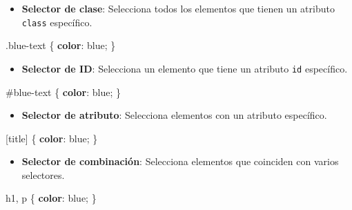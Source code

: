 \documentclass[
  a4paper,
  DIV=11,
  numbers=noendperiod,
  onepage,
  openany]{scrreprt}
\newenvironment{Shaded}{\begin{snugshade}}{\end{snugshade}}
\newcommand{\CharTok}[1]{\textcolor[rgb]{0.13,0.47,0.30}{#1}}
\newcommand{\ConstantTok}[1]{\textcolor[rgb]{0.56,0.35,0.01}{#1}}
\newcommand{\ExtensionTok}[1]{\textcolor[rgb]{0.00,0.23,0.31}{#1}}
\newcommand{\FunctionTok}[1]{\textcolor[rgb]{0.28,0.35,0.67}{#1}}
\newcommand{\KeywordTok}[1]{\textcolor[rgb]{0.00,0.23,0.31}{\textbf{#1}}}
\newcommand{\NormalTok}[1]{\textcolor[rgb]{0.00,0.23,0.31}{#1}}
\newcommand{\OperatorTok}[1]{\textcolor[rgb]{0.37,0.37,0.37}{#1}}
\newcommand{\PreprocessorTok}[1]{\textcolor[rgb]{0.68,0.00,0.00}{#1}}
\newcommand{\SpecialStringTok}[1]{\textcolor[rgb]{0.13,0.47,0.30}{#1}}
\providecommand{\tightlist}{%
  \setlength{\itemsep}{0pt}\setlength{\parskip}{0pt}}\usepackage{longtable,booktabs,array}
\begin{document}
\begin{tcolorbox}
\begin{itemize}
\tightlist
\item
  \textbf{Selector de clase}: Selecciona todos los elementos que tienen
  un atributo \texttt{class} específico.
\end{itemize}

\begin{Shaded}
\begin{Highlighting}[]
\FunctionTok{.blue{-}text}\NormalTok{ \{}
  \KeywordTok{color}\CharTok{:} \ConstantTok{blue}\OperatorTok{;}
\NormalTok{\}}
\end{Highlighting}
\end{Shaded}

\begin{itemize}
\tightlist
\item
  \textbf{Selector de ID}: Selecciona un elemento que tiene un atributo
  \texttt{id} específico.
\end{itemize}

\begin{Shaded}
\begin{Highlighting}[]
\PreprocessorTok{\#blue{-}text}\NormalTok{ \{}
  \KeywordTok{color}\CharTok{:} \ConstantTok{blue}\OperatorTok{;}
\NormalTok{\}}
\end{Highlighting}
\end{Shaded}

\begin{itemize}
\tightlist
\item
  \textbf{Selector de atributo}: Selecciona elementos con un atributo
  específico.
\end{itemize}

\begin{Shaded}
\begin{Highlighting}[]
\ExtensionTok{[}\SpecialStringTok{title}\ExtensionTok{]}\NormalTok{ \{}
  \KeywordTok{color}\CharTok{:} \ConstantTok{blue}\OperatorTok{;}
\NormalTok{\}}
\end{Highlighting}
\end{Shaded}

\begin{itemize}
\tightlist
\item
  \textbf{Selector de combinación}: Selecciona elementos que coinciden
  con varios selectores.
\end{itemize}

\begin{Shaded}
\begin{Highlighting}[]
\NormalTok{h1}\OperatorTok{,}\NormalTok{ p \{}
  \KeywordTok{color}\CharTok{:} \ConstantTok{blue}\OperatorTok{;}
\NormalTok{\}}
\end{Highlighting}
\end{Shaded}


\end{tcolorbox}
\end{document}
